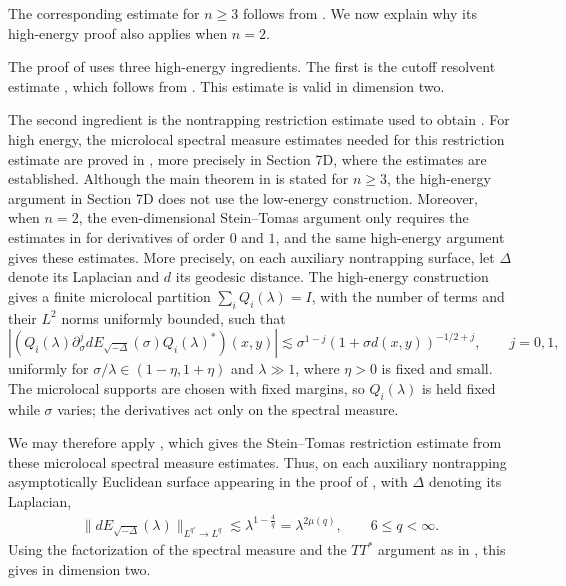 \documentclass[11pt]{amsart}
\newcommand{\la}{\lambda}
\begin{document}
The corresponding estimate for $n\geq3$ follows from \cite[Proposition 8.2]{Guillarmou2010RestrictionAS}. We now explain why its high-energy proof also applies when $n=2$.

The proof of \cite[Proposition 8.2]{Guillarmou2010RestrictionAS}
uses three high-energy ingredients. The first is the cutoff resolvent
estimate \cite[(8.10)]{Guillarmou2010RestrictionAS}, which follows
from \cite[Theorem 1.1]{Cardoso2002UniformEO}. This estimate is valid
in dimension two.

The second ingredient is the nontrapping restriction estimate used
to obtain \cite[(8.12)]{Guillarmou2010RestrictionAS}. For high
energy, the microlocal spectral measure estimates needed for this
restriction estimate are proved in
\cite[Section 7]{Guillarmou2010RestrictionAS}, more precisely in
Section 7D, where the estimates \cite[(1.9)]{Guillarmou2010RestrictionAS}
are established. Although the main theorem in
\cite{Guillarmou2010RestrictionAS} is stated for $n\geq3$, the
high-energy argument in Section 7D does not use the low-energy
construction. Moreover, when $n=2$, the even-dimensional
Stein--Tomas argument only requires the estimates in \cite[(1.9)]
{Guillarmou2010RestrictionAS} for derivatives of order $0$ and $1$,
and the same high-energy argument gives these estimates.
More precisely, on each auxiliary nontrapping surface, let $\Delta$ denote its Laplacian and $d$ its geodesic distance. The high-energy construction gives a finite microlocal partition $\sum_iQ_i(\la)=I$, with the number of terms and their $L^2$ norms uniformly bounded, such that
\[
\left|\left(Q_i(\la)\partial_\sigma^j dE_{\sqrt{-\Delta}}(\sigma)Q_i(\la)^*\right)(x,y)\right|
\lesssim\sigma^{1-j}(1+\sigma d(x,y))^{-1/2+j},\qquad j=0,1,
\]
uniformly for $\sigma/\la\in(1-\eta,1+\eta)$ and $\la\gg1$, where $\eta>0$ is fixed and small. The microlocal supports are chosen with fixed margins, so $Q_i(\la)$ is held fixed while $\sigma$ varies; the derivatives act only on the spectral measure.


We may therefore apply \cite[Theorem 1]{xichen}, which gives the
Stein--Tomas restriction estimate from these microlocal spectral
measure estimates. Thus, on each auxiliary nontrapping
asymptotically Euclidean surface appearing in the proof of
\cite[Proposition 8.2]{Guillarmou2010RestrictionAS}, with $\Delta$
denoting its Laplacian,
\begin{align}
\|dE_{\sqrt{-\Delta}}(\la)\|_{L^{q'}\to L^q}
\lesssim
\la^{1-\frac4q}
=
\la^{2\mu(q)},
\qquad 6\leq q<\infty.
\end{align}
Using the factorization of the spectral measure and the $TT^*$
argument as in
\cite[Section 8]{Guillarmou2010RestrictionAS}, this gives
\cite[(8.12)]{Guillarmou2010RestrictionAS} in dimension two.
\end{document}
